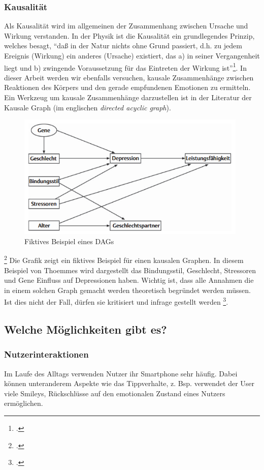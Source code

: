 \subsubsection{Kausalität}
Als Kausalität wird im allgemeinen der Zusammenhang zwischen Ursache und Wirkung verstanden. In der Physik ist die Kausalität ein grundlegendes Prinzip, welches besagt, ``daß in der Natur nichts ohne Grund passiert, d.h. zu jedem Ereignis (Wirkung) ein anderes (Ursache) existiert, das a) in seiner Vergangenheit liegt und b) zwingende Voraussetzung für das Eintreten der Wirkung ist''\footcite{Sav18}.
In dieser Arbeit werden wir ebenfalls versuchen, kausale Zusammenhänge zwischen Reaktionen des Körpers und den gerade empfundenen Emotionen zu ermitteln.
Ein Werkzeug um kausale Zusammenhänge darzustellen ist in der Literatur der Kausale Graph (im englischen \textit{directed acyclic graph}).
\begin{figure}[h]
	\centering
	\includegraphics[width=11cm]{Bilder/dag.png}
	\caption[Fiktives Beispiel eines DAGs]{Fiktives Beispiel eines DAGs\footnotemark}
\end{figure}
\footcite[Vgl.][Kausale Graphen - DAGs]{Tho11}
Die Grafik zeigt ein fiktives Beispiel für einen kausalen Graphen. In diesem Beispiel von Thoemmes wird dargestellt das Bindungsstil, Geschlecht, Stressoren und Gene Einfluss auf Depressionen haben. Wichtig ist, dass alle Annahmen die in einem solchen Graph gemacht werden theoretisch begründet werden müssen. Ist dies nicht der Fall, dürfen sie kritisiert und infrage gestellt werden \footcite[Vgl. ][S.3 Kausale Graphen - DAGs]{Tho11}.
\subsection{Welche Möglichkeiten gibt es?}
\subsubsection{Nutzerinteraktionen}
Im Laufe des Alltags verwenden Nutzer ihr Smartphone sehr häufig. Dabei können unteranderem Aspekte wie das Tippverhalte, 
z. Bsp. verwendet der User viele Smileys, Rückschlüsse auf den emotionalen Zustand eines Nutzers ermöglichen.
